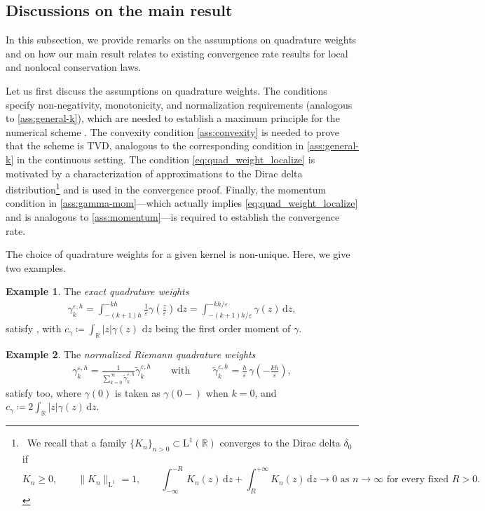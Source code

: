 \documentclass[10pt]{amsart}
\theoremstyle{plain}
\theoremstyle{definition}
\newtheorem{examplequad}{Example}[section]
\numberwithin{equation}{section}
\newcommand{\eps}{{\varepsilon}}
\newcommand{\dz}{{\, \mathrm{d}z}}
\newcommand{\dd}{\,\mathrm{d}}
\begin{document}
\subsection{Discussions on the main result}

In this subsection, we provide remarks on the assumptions on quadrature weights and on how our main result relates to existing convergence rate results for local and nonlocal conservation laws.

Let us first discuss the assumptions on quadrature weights. The conditions  specify non-negativity, monotonicity, and normalization requirements (analogous to \cref{ass:general-k}), which are needed to establish a maximum principle for the numerical scheme . The convexity condition \cref{ass:convexity} is needed to prove that the scheme is TVD, analogous to the corresponding condition in \cref{ass:general-k} in the continuous setting. The condition \cref{eq:quad_weight_localize} is motivated by a characterization of approximations to the Dirac delta distribution\footnote{~We recall that a family $\{K_n\}_{n >0} \subset \mathrm{L}^1(\mathbb R)$ converges to the Dirac delta $\delta_0$ if 
\[ K_n \ge 0, \qquad 
\|K_n\|_{\mathrm{L}^1} = 1, \qquad \int_{-\infty}^{-R} K_n(z) \, \mathrm d z + \int_{R}^{+\infty} K_n(z) \, \mathrm d z \to 0 \text{ as $n \to \infty$ for every fixed $R>0$.}
\]} and is used in the convergence proof.
Finally, the momentum condition in \cref{ass:gamma-mom}---which actually implies \cref{eq:quad_weight_localize} and is analogous to \cref{ass:momentum}---is required to establish the convergence rate. 

The choice of quadrature weights for a given kernel is non-unique. Here, we give two examples.
\begin{examplequad}\label{ex:exact}
The \emph{exact quadrature weights}
\begin{align}\label{eq:quad-2}
    \gamma_k^{\eps,h} = \int_{-(k+1)h}^{-kh} \frac1\eps \gamma\left(\frac{z}{\eps}\right) \dd z = \int_{-(k+1)h/\eps}^{-kh/\eps} \gamma(z) \, \mathrm d z,
\end{align}
satisfy , with $c_\gamma\coloneqq \int_{\mathbb{R}} |z|\gamma(z)\, \dz$ being the first order moment of $\gamma$.
\end{examplequad}

 
\begin{examplequad}\label{ex:Riemann} 
The \emph{normalized Riemann quadrature weights}
\begin{align}\label{eq:quad-3}
\gamma_k^{\eps,h} = \frac1{\sum_{k=0}^\infty \tilde{\gamma}_k^{\eps,h}}\tilde{\gamma}_k^{\eps,h} \qquad \text{with } \qquad \tilde{\gamma}_k^{\eps,h} = \frac{h}\eps\, \gamma\left(-\frac{kh}\eps\right),
\end{align}
satisfy  too, where $\gamma(0)$ is taken as $\gamma(0-)$ when $k=0$, and $c_\gamma\coloneqq 2\int_{\mathbb{R}} |z|\gamma(z)\, \mathrm d z$.
\end{examplequad}
\end{document}
